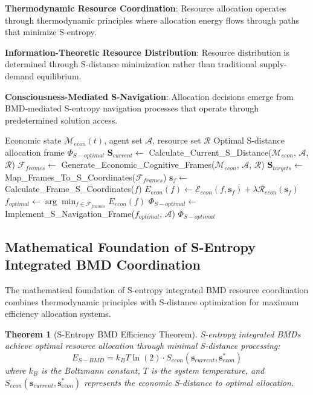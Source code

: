 \documentclass[12pt,a4paper]{article}
\newtheorem{theorem}{Theorem}
\begin{document}
\textbf{Thermodynamic Resource Coordination}: Resource allocation operates through thermodynamic principles where allocation energy flows through paths that minimize S-entropy.

\textbf{Information-Theoretic Resource Distribution}: Resource distribution is determined through S-distance minimization rather than traditional supply-demand equilibrium.

\textbf{Consciousness-Mediated S-Navigation}: Allocation decisions emerge from BMD-mediated S-entropy navigation processes that operate through predetermined solution access.

\begin{algorithm}
\caption{S-Entropy Integrated BMD Resource Coordination}
\begin{algorithmic}[1]
\Require Economic state $\mathcal{M}_{econ}(t)$, agent set $\mathcal{A}$, resource set $\mathcal{R}$
\Ensure Optimal S-distance allocation frame $\Phi_{S-optimal}$
\State $\mathbf{S}_{current} \leftarrow$ Calculate\_Current\_S\_Distance($\mathcal{M}_{econ}$, $\mathcal{A}$, $\mathcal{R}$)
\State $\mathcal{F}_{frames} \leftarrow$ Generate\_Economic\_Cognitive\_Frames($\mathcal{M}_{econ}$, $\mathcal{A}$, $\mathcal{R}$)
\State $\mathbf{S}_{targets} \leftarrow$ Map\_Frames\_To\_S\_Coordinates($\mathcal{F}_{frames}$)
    \State $\mathbf{s}_f \leftarrow$ Calculate\_Frame\_S\_Coordinates($f$)
    \State $E_{econ}(f) \leftarrow \mathcal{E}_{econ}(f, \mathbf{s}_f) + \lambda \mathcal{R}_{econ}(\mathbf{s}_f)$
\EndFor
\State $f_{optimal} \leftarrow \arg\min_{f \in \mathcal{F}_{frames}} E_{econ}(f)$
\State $\Phi_{S-optimal} \leftarrow$ Implement\_S\_Navigation\_Frame($f_{optimal}$, $\mathcal{A}$)
\Return $\Phi_{S-optimal}$
\end{algorithmic}
\end{algorithm}

\subsection{Mathematical Foundation of S-Entropy Integrated BMD Coordination}

The mathematical foundation of S-entropy integrated BMD resource coordination combines thermodynamic principles with S-distance optimization for maximum efficiency allocation systems.

\begin{theorem}[S-Entropy BMD Efficiency Theorem]
S-entropy integrated BMDs achieve optimal resource allocation through minimal S-distance processing:
\begin{equation}
E_{S-BMD} = k_B T \ln(2) \cdot S_{econ}(\mathbf{s}_{current}, \mathbf{s}^*_{econ})
\end{equation}
where $k_B$ is the Boltzmann constant, $T$ is the system temperature, and $S_{econ}(\mathbf{s}_{current}, \mathbf{s}^*_{econ})$ represents the economic S-distance to optimal allocation.
\end{theorem}
\end{document}
